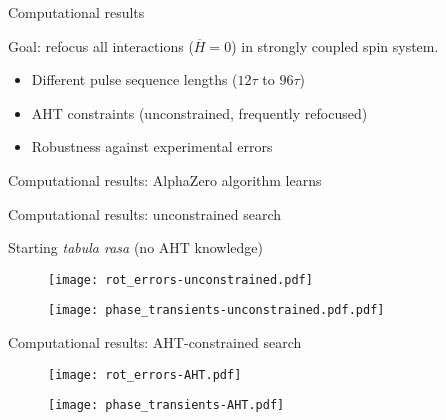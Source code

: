 \documentclass{beamer}
\begin{document}
\begin{frame}{Computational results}

Goal: refocus all interactions (\(\overline{H}=0\)) in strongly coupled spin system.
\begin{itemize}
    \item Different pulse sequence lengths ($12\tau$ to $96\tau$)
    \item AHT constraints (unconstrained, frequently refocused)
    \item Robustness against experimental errors
\end{itemize}


\end{frame}

\begin{frame}{Computational results: AlphaZero algorithm learns}


\end{frame}

\begin{frame}[allowframebreaks]%
{Computational results: unconstrained search}

Starting \emph{tabula rasa} (no AHT knowledge)

\begin{figure}
\centering
\texttt{[image: rot\_errors-unconstrained.pdf]}
\end{figure}

\begin{figure}
\centering
\texttt{[image: phase\_transients-unconstrained.pdf.pdf]}
\end{figure}

\end{frame}


\begin{frame}[allowframebreaks]%
{Computational results: AHT-constrained search}

\begin{figure}
\centering
\texttt{[image: rot\_errors-AHT.pdf]}
\end{figure}

\begin{figure}
\centering
\texttt{[image: phase\_transients-AHT.pdf]}
\end{figure}

\end{frame}
\end{document}
